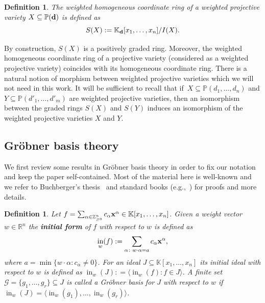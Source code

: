\documentclass[pdftex]{sigma}%
\newtheorem{Definition}[Theorem]{Definition}
\numberwithin{equation}{section}
\DeclareMathOperator{\init}{in}
\begin{document}
\begin{Definition}
The {\it weighted homogeneous coordinate ring} of a weighted projective variety $X\subseteq \mathbb P ({\bf d})$ is defined as
\begin{displaymath}
S(X):= \mathbb{K}_{\bf d}[x_1,\dots , x_n]/ I(X).
\end{displaymath}
\end{Definition}
By construction, $S(X)$ is a positively graded ring. Moreover, the weighted homogeneous coordinate ring of a projective variety (considered as a weighted projective variety) coincides with its homogeneous coordinate ring.
There is a natural notion of morphism between weighted projective varieties which we will not need in this work.
It will be sufficient to recall that if~$X\subseteq \mathbb P(d_1, \dots , d_n)$ and $Y\subseteq \mathbb P(d'_1, \dots , d'_m)$ are weighted projective varieties, then an isomorphism between the graded rings $S(X)$ and $S(Y)$ induces an isomorphism of the weighted projective varieties $X$ and $Y$.




\subsection{Gr\"obner basis theory}
We first review some results in Gr\"obner basis theory %
in order to fix our notation and
keep the paper self-contained. Most of the material here is well-known and we refer to Buchberger's thesis~\cite{buchberger2006bruno} and standard books (e.g.,~\cite{loustaunau1994introduction,herzog2011monomial,kreuzer2005computational,GB_Bernd}) for proofs and more details.


\begin{Definition}
Let $f = \sum_{\alpha\in \mathbb{Z}^n_{\geq 0}} c_{\alpha} {\bf x}^{\alpha} \in \mathbb K[x_1, \dots , x_n]$.
Given a {\it weight vector} $w\in \mathbb R^n$ the {\bf initial form} of $f$ with respect to $w$ is defined as
\begin{displaymath}
\init_w(f):=\sum_{\alpha\colon w\cdot \alpha=a} c_{\alpha}{\bf x}^{\alpha},
\end{displaymath}
where $a= \min \{w\cdot \alpha \colon c_{\alpha}\not =0\}$. For an ideal $J\subseteq \mathbb K[x_1, \dots , x_n]$ its {\it initial ideal} with respect to $w$ is defined as $\init_w(J)\colon =\langle \init_w(f)\colon f\in J\rangle$.
A finite set $\mathcal{G}=\{g_1,\ldots,g_r\}\subseteq J$ is called a {\it Gr\"obner basis} for $J$
with respect to $w$ if $\init_w(J)=\langle \init_w(g_1),\ldots,\init_w(g_r)\rangle$.
\end{Definition}
\end{document}
